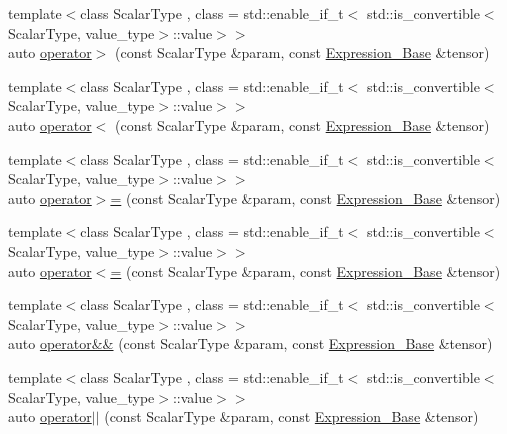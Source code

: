 \begin{DoxyCompactItemize}
\item 
{\footnotesize template$<$class Scalar\+Type , class  = std\+::enable\+\_\+if\+\_\+t$<$   std\+::is\+\_\+convertible$<$\+Scalar\+Type, value\+\_\+type$>$\+::value$>$$>$ }\\auto \hyperlink{classbc_1_1tensors_1_1Expression__Base_a423aa9cadcd7aced726017de5d273830}{operator$>$} (const Scalar\+Type \&param, const \hyperlink{classbc_1_1tensors_1_1Expression__Base}{Expression\+\_\+\+Base} \&tensor)
\item 
{\footnotesize template$<$class Scalar\+Type , class  = std\+::enable\+\_\+if\+\_\+t$<$   std\+::is\+\_\+convertible$<$\+Scalar\+Type, value\+\_\+type$>$\+::value$>$$>$ }\\auto \hyperlink{classbc_1_1tensors_1_1Expression__Base_a63cf71d0a07f2a81ac7ae1d1b1d29a83}{operator$<$} (const Scalar\+Type \&param, const \hyperlink{classbc_1_1tensors_1_1Expression__Base}{Expression\+\_\+\+Base} \&tensor)
\item 
{\footnotesize template$<$class Scalar\+Type , class  = std\+::enable\+\_\+if\+\_\+t$<$   std\+::is\+\_\+convertible$<$\+Scalar\+Type, value\+\_\+type$>$\+::value$>$$>$ }\\auto \hyperlink{classbc_1_1tensors_1_1Expression__Base_a991bb7ae9ea02aa3147e1fcf959e566e}{operator$>$=} (const Scalar\+Type \&param, const \hyperlink{classbc_1_1tensors_1_1Expression__Base}{Expression\+\_\+\+Base} \&tensor)
\item 
{\footnotesize template$<$class Scalar\+Type , class  = std\+::enable\+\_\+if\+\_\+t$<$   std\+::is\+\_\+convertible$<$\+Scalar\+Type, value\+\_\+type$>$\+::value$>$$>$ }\\auto \hyperlink{classbc_1_1tensors_1_1Expression__Base_a44ffee6bfc307f5eb90b79dd2598f196}{operator$<$=} (const Scalar\+Type \&param, const \hyperlink{classbc_1_1tensors_1_1Expression__Base}{Expression\+\_\+\+Base} \&tensor)
\item 
{\footnotesize template$<$class Scalar\+Type , class  = std\+::enable\+\_\+if\+\_\+t$<$   std\+::is\+\_\+convertible$<$\+Scalar\+Type, value\+\_\+type$>$\+::value$>$$>$ }\\auto \hyperlink{classbc_1_1tensors_1_1Expression__Base_ad7e1f92a9e331758dc8d3dd4b644dff7}{operator\&\&} (const Scalar\+Type \&param, const \hyperlink{classbc_1_1tensors_1_1Expression__Base}{Expression\+\_\+\+Base} \&tensor)
\item 
{\footnotesize template$<$class Scalar\+Type , class  = std\+::enable\+\_\+if\+\_\+t$<$   std\+::is\+\_\+convertible$<$\+Scalar\+Type, value\+\_\+type$>$\+::value$>$$>$ }\\auto \hyperlink{classbc_1_1tensors_1_1Expression__Base_a366931f8562cdb9f421a0296b44cb0ac}{operator$\vert$$\vert$} (const Scalar\+Type \&param, const \hyperlink{classbc_1_1tensors_1_1Expression__Base}{Expression\+\_\+\+Base} \&tensor)

\end{DoxyCompactItemize}
